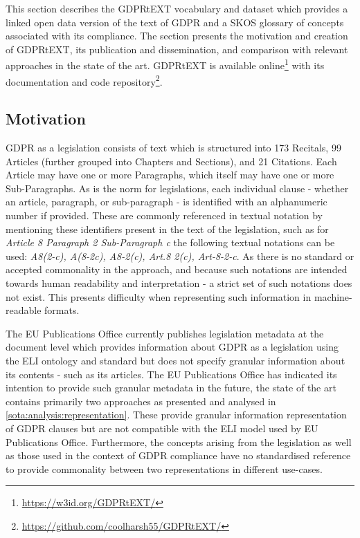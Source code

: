 This section describes the GDPRtEXT vocabulary and dataset which provides a linked open data version of the text of GDPR and a SKOS glossary of concepts associated with its compliance. The section presents the motivation and creation of GDPRtEXT, its publication and dissemination, and comparison with relevant approaches in the state of the art. GDPRtEXT is available online\footnote{\url{https://w3id.org/GDPRtEXT/}} with its documentation and code repository\footnote{\url{https://github.com/coolharsh55/GDPRtEXT/}}.

\subsection{Motivation}
GDPR as a legislation consists of text which is structured into 173 Recitals, 99 Articles (further grouped into Chapters and Sections), and 21 Citations. Each Article may have one or more Paragraphs, which itself may have one or more Sub-Paragraphs. As is the norm for legislations, each individual clause - whether an article, paragraph, or sub-paragraph - is identified with an alphanumeric number if provided. These are commonly referenced in textual notation by mentioning these identifiers present in the text of the legislation, such as for \textit{Article 8 Paragraph 2 Sub-Paragraph c} the following textual notations can be used: \textit{A8(2-c), A(8-2c), A8-2(c), Art.8 2(c), Art-8-2-c}. As there is no standard or accepted commonality in the approach, and because such notations are intended towards human readability and interpretation - a strict set of such notations does not exist. This presents difficulty when representing such information in machine-readable formats.

The EU Publications Office currently publishes legislation metadata at the document level which provides information about GDPR as a legislation using the ELI ontology and standard \cite{thomas_european_2019} but does not specify granular information about its contents - such as its articles. The EU Publications Office has indicated its intention to provide such granular metadata in the future, the state of the art contains primarily two approaches as presented and analysed in \autoref{sota:analysis:representation}. These provide granular information representation of GDPR clauses but are not compatible with the ELI model used by EU Publications Office. Furthermore, the concepts arising from the legislation as well as those used in the context of GDPR compliance have no standardised reference to provide commonality between two representations in different use-cases. 

